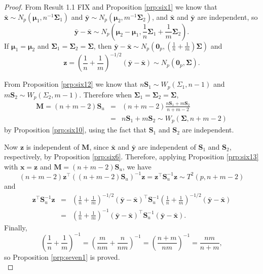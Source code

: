 \documentclass[]{book}
\theoremstyle{definition}
\theoremstyle{definition}
\theoremstyle{definition}
\theoremstyle{remark}
\begin{document}
\begin{proof}
{}From Result 1.1 FIX and Proposition \ref{prp:six1} we know that \(\bar{\boldsymbol x} \sim N_p \left(\boldsymbol \mu_1,n^{-1}\boldsymbol \Sigma_1 \right)\) and \(\bar{\boldsymbol y} \sim N_p \left(\boldsymbol \mu_2,m^{-1}\boldsymbol \Sigma_2 \right)\), and \(\bar{\boldsymbol x}\) and \(\bar{\boldsymbol y}\) are independent, so
\[\bar{\boldsymbol y} - \bar{\boldsymbol x} \sim N_p \left(\boldsymbol \mu_2 - \boldsymbol \mu_1, \frac{1}{n}\boldsymbol \Sigma_1 + \frac{1}{m} \boldsymbol \Sigma_2 \right).\]
If \(\boldsymbol \mu_1 = \boldsymbol \mu_2\) and \(\boldsymbol \Sigma_1 = \boldsymbol \Sigma_2 = \boldsymbol \Sigma\), then \(\bar{\boldsymbol y} - \bar{\boldsymbol x} \sim N_p \left(\boldsymbol 0_p, \left(\frac{1}{n} + \frac{1}{m} \right)\boldsymbol \Sigma\right)\) and
\[\boldsymbol z= \left(\frac{1}{n} + \frac{1}{m} \right)^{-1/2} (\bar{\boldsymbol y} - \bar{\boldsymbol x}) \sim N_p(\boldsymbol 0_p,\boldsymbol \Sigma).\]

From Proposition \ref{prp:six12} we know that \(n\boldsymbol S_1 \sim W_p(\Sigma_1,n-1)\) and \(m\boldsymbol S_2 \sim W_p(\Sigma_2,m-1)\). Therefore when \(\boldsymbol \Sigma_1 = \boldsymbol \Sigma_2 = \boldsymbol \Sigma\),
\begin{eqnarray*}
\boldsymbol M= (n+m-2)\boldsymbol S_u &=& (n+m-2)\frac{n\boldsymbol S_1 + m\boldsymbol S_2}{n+m-2} \\
&=& n\boldsymbol S_1 + m\boldsymbol S_2 \sim W_p(\boldsymbol \Sigma,n+m-2)
\end{eqnarray*}
by Proposition \ref{prp:six10}, using the fact that \(\boldsymbol S_1\) and \(\boldsymbol S_2\) are independent.

Now \(\boldsymbol z\) is independent of \(\boldsymbol M\), since \(\bar{\boldsymbol x}\) and \(\bar{\boldsymbol y}\) are independent of \(\boldsymbol S_1\) and \(\boldsymbol S_2\), respectively, by Proposition \ref{prp:six6}. Therefore, applying Proposition \ref{prp:six13} with \(\boldsymbol x= \boldsymbol z\) and \(\boldsymbol M= (n+m-2)\boldsymbol S_u\), we have
\[(n+m-2) \boldsymbol z^\top ((n+m-2)\boldsymbol S_u)^{-1} \boldsymbol z= \boldsymbol z^\top \boldsymbol S_u^{-1} \boldsymbol z\sim T^2(p,n+m-2)\] and
\begin{eqnarray*}
\boldsymbol z^\top \boldsymbol S_u^{-1} \boldsymbol z&=& \left(\frac{1}{n} + \frac{1}{m} \right)^{-1/2} (\bar{\boldsymbol y} - \bar{\boldsymbol x})^\top \boldsymbol S_u^{-1} \left(\frac{1}{n} + \frac{1}{m} \right)^{-1/2} (\bar{\boldsymbol y} - \bar{\boldsymbol x}) \\
&=& \left(\frac{1}{n} + \frac{1}{m} \right)^{-1} (\bar{\boldsymbol y} - \bar{\boldsymbol x})^\top \boldsymbol S_u^{-1} (\bar{\boldsymbol y} - \bar{\boldsymbol x}).
\end{eqnarray*}
Finally,
\[\left(\frac{1}{n} + \frac{1}{m} \right)^{-1} = \left(\frac{m}{nm} + \frac{n}{nm} \right)^{-1} = \left(\frac{n+m}{nm} \right)^{-1} = \frac{nm}{n+m},\]
so Proposition \ref{prp:seven1} is proved.\\
\end{proof}
\end{document}

